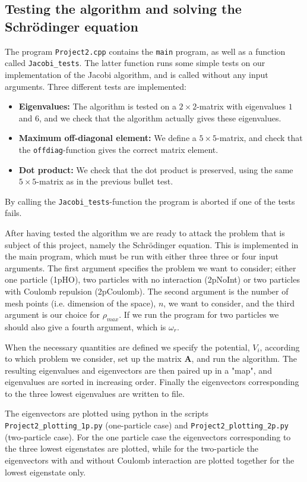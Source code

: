 \documentclass[12pt, a4paper]{article}
\begin{document}
\subsection{Testing the algorithm and solving the Schrödinger equation}

The program \texttt{Project2.cpp} contains the \texttt{main} program, as well as a function called 
\texttt{Jacobi\_tests}. The latter function runs some simple tests on our implementation of the 
Jacobi algorithm, and is called without any input arguments. Three different tests are implemented: 
\begin{itemize}
\item \textbf{Eigenvalues:} The algorithm is tested on a $2\times 2$-matrix with eigenvalues $1$ and $6$, 
and we check that the algorithm actually gives these eigenvalues.  
\item \textbf{Maximum off-diagonal element:} We define a $5\times 5$-matrix, and check that the 
\texttt{offdiag}-function gives the correct matrix element. 
\item \textbf{Dot product:} We check that the dot product is preserved, using the same $5\times 5$-matrix 
as in the previous bullet test. 
\end{itemize}
By calling the \texttt{Jacobi\_tests}-function the program is aborted if one of the tests fails. 

After having tested the algorithm we are ready to attack the problem that is subject of this project, 
namely the Schrödinger equation. This is implemented in the main program, which must be run with either 
three three or four input arguments. The first argument specifies the problem we want to consider; 
either one particle (1pHO), two particles with no interaction (2pNoInt) or two particles with Coulomb 
repulsion (2pCoulomb). The second argument is the number of mesh points (i.e. dimension of the space), 
$n$, we want to consider, and the third argument is our choice for $\rho_{max}$. If we run the program 
for two particles we should also give a fourth argument, which is $\omega_r$.  

When the necessary quantities are defined we specify the potential, $V_i$, according to which problem 
we consider, set up the matrix $\mathbf{A}$, and run the algorithm. The resulting eigenvalues and
eigenvectors are then paired up in a "map", and eigenvalues are sorted in increasing order. 
Finally the eigenvectors corresponding to the three lowest eigenvalues are written to file. 

The eigenvectors are plotted using python in the scripts \texttt{Project2\_plotting\_1p.py} 
(one-particle case) and \texttt{Project2\_plotting\_2p.py} (two-particle case). For the one particle case 
the eigenvectors corresponding to the three lowest eigenstates are plotted, while for the two-particle 
the eigenvectors with and without Coulomb interaction are plotted together for the lowest eigenstate only.
\end{document}
